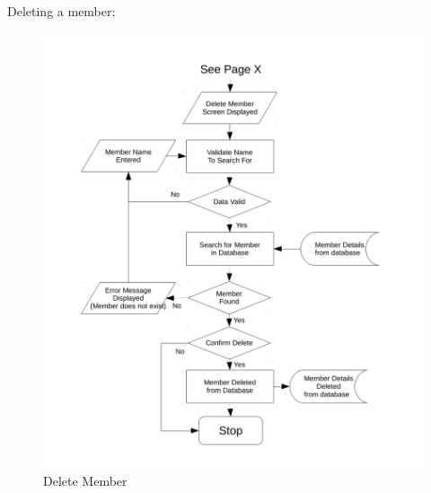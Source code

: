 Deleting a member:
\begin{figure}[H]
\includegraphics[width=\textwidth]{./Design/images/FC_delete_member.pdf}
    \caption{Delete Member} \label{fig:Flow Chart Delete Member}
\end{figure}

